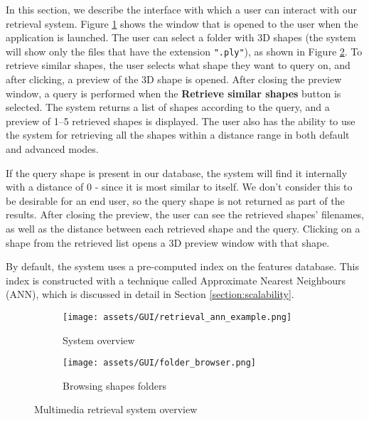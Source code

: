In this section, we describe the interface with which a user can interact with our retrieval system.
Figure \ref{fig:gui-overview-app} shows the window that is opened to the user when the application is launched.
The user can select a folder with 3D shapes (the system will show only the files that have the extension \verb!".ply"!),
as shown in Figure \ref{fig:gui-overview-file-browser}.
To retrieve similar shapes, the user selects what shape they want to query on, and after clicking, a preview 
of the 3D shape is opened.
After closing the preview window, a query is performed when the \textbf{Retrieve similar shapes} button is selected.
The system returns a list of shapes according to the query, and a preview of 1--5 retrieved shapes is displayed.
The user also has the ability to use the system for retrieving all the shapes within a distance range in both default
and advanced modes.

If the query shape is present in our database, the system will find it internally with a distance of 0 - since it
is most similar to itself.
We don't consider this to be desirable for an end user, so the query shape is not returned as part of the results.
After closing the preview, the user can see the retrieved shapes' filenames, as well as the distance between each 
retrieved shape and the query.
Clicking on a shape from the retrieved list opens a 3D preview window with that shape. 

By default, the system uses a pre-computed index on the features database.
This index is constructed with a technique called Approximate Nearest Neighbours (ANN), which is discussed in detail 
in Section \ref{section:scalability}.
\begin{figure}[H]
    \centering
    \begin{subfigure}[b]{0.45\textwidth} 
        \texttt{[image: assets/GUI/retrieval\_ann\_example.png]}
        \caption{System overview}
        \label{fig:gui-overview-app}
    \end{subfigure}
    \hfill
    \begin{subfigure}[b]{0.45\textwidth} 
        \texttt{[image: assets/GUI/folder\_browser.png]}
        \caption{Browsing shapes folders}
        \label{fig:gui-overview-file-browser}
    \end{subfigure}
    
    \caption{Multimedia retrieval system overview}
    \label{fig:gui-overview}
\end{figure}

